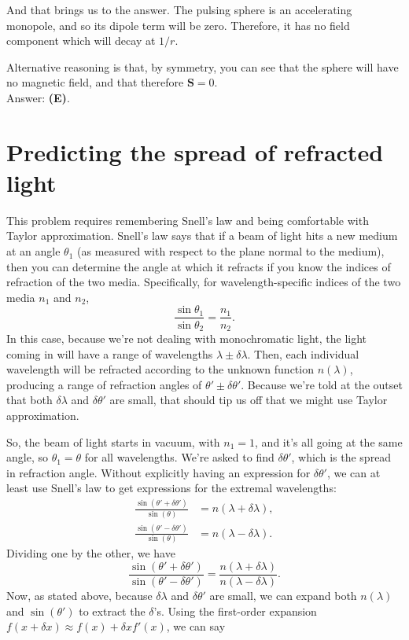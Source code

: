 \documentclass[11pt]{paper}
\newcommand{\answer}[1]{Answer: \textbf{(#1)}.}
\begin{document}
And that brings us to the answer.  The pulsing sphere is an accelerating monopole, and so its dipole term will be zero.  Therefore, it has no field component which will decay at $1/r$.

Alternative reasoning is that, by symmetry, you can see that the sphere will have no magnetic field, and that therefore $\mathbf{S}=0$.\\

\answer{E}

\section{Predicting the spread of refracted light}
This problem requires remembering Snell's law and being comfortable with Taylor approximation.  Snell's law says that if a beam of light hits a new medium at an angle $\theta_1$ (as measured with respect to the plane normal to the medium), then you can determine the angle at which it refracts if you know the indices of refraction of the two media.  Specifically, for wavelength-specific indices of the two media $n_1$ and $n_2$,
\begin{equation}
	\frac{\sin\theta_1}{\sin\theta_2} = \frac{n_1}{n_2}.
\end{equation}
In this case, because we're not dealing with monochromatic light, the light coming in will have a range of wavelengths $\lambda\pm\delta\lambda$.  Then, each individual wavelength will be refracted according to the unknown function $n(\lambda)$, producing a range of refraction angles of $\theta'\pm\delta\theta'$.  Because we're told at the outset that both $\delta\lambda$ and $\delta\theta'$ are small, that should tip us off that we might use Taylor approximation.

So, the beam of light starts in vacuum, with $n_1 = 1$, and it's all going at the same angle, so $\theta_1 = \theta$ for all wavelengths.  We're asked to find $\delta\theta'$, which is the spread in refraction angle.  Without explicitly having an expression for $\delta\theta'$, we can at least use Snell's law to get expressions for the extremal wavelengths:
\begin{align}
	\frac{\sin\left(\theta' + \delta\theta'\right)}{\sin\left(\theta\right)} &= n(\lambda + \delta\lambda),\\
	\frac{\sin\left(\theta' - \delta\theta'\right)}{\sin\left(\theta\right)} &= n(\lambda - \delta\lambda).
\end{align}
Dividing one by the other, we have
\begin{equation}
	\frac{\sin\left(\theta' + \delta\theta'\right)}{\sin\left(\theta' - \delta\theta'\right)} = \frac{n(\lambda + \delta\lambda)}{n(\lambda - \delta\lambda)}.
\end{equation}
Now, as stated above, because $\delta\lambda$ and $\delta\theta'$ are small, we can expand both $n(\lambda)$ and $\sin(\theta')$ to extract the $\delta$'s.  Using the first-order expansion $f(x+\delta x)\approx f(x) + \delta xf'(x)$, we can say
\end{document}
